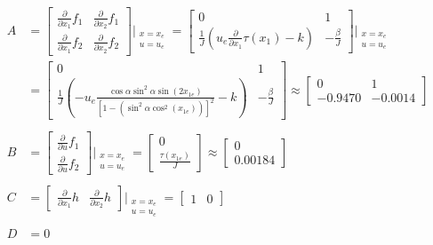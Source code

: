 \documentclass[a4paper, 11pt]{article}
\begin{document}
\begin{align*}
A &= \begin{bmatrix}
    \frac \partial {\partial x_1} f_1 & \frac \partial {\partial x_2} f_1
    \\ \frac \partial {\partial x_1} f_2 & \frac \partial {\partial x_2} f_2
\end{bmatrix} \big |_{\substack{x = x_e \\ u = u_e}}
= \begin{bmatrix}
    0 & 1
    \\ \frac 1 J (u_e \frac \partial {\partial x_1} \tau(x_1) - k) & - \frac \beta J
\end{bmatrix} \big |_{\substack{x = x_e \\ u = u_e}}
\\ &= \begin{bmatrix}
0 & 1
\\ \frac 1 J (-u_e \frac {\cos \alpha \sin^2 \alpha \sin(2 x_{1e})} {[1-(\sin^2\alpha \cos^2(x_{1e}))]^2} - k) & - \frac \beta J
\end{bmatrix}
\approx \begin{bmatrix}
0 & 1
\\ -0.9470 & -0.0014
\end{bmatrix}
\\ \\
B &= \begin{bmatrix}
    \frac \partial {\partial u} f_1
    \\ \frac \partial {\partial u} f_2
\end{bmatrix} \big |_{\substack{x = x_e \\ u = u_e}}
= \begin{bmatrix}
    0
    \\ \frac {\tau(x_{1e})} J
\end{bmatrix} \approx \begin{bmatrix}
    0
    \\ 0.00184
\end{bmatrix}
\\ \\
C &= \begin{bmatrix}
    \frac \partial {\partial x_1} h & \frac \partial {\partial x_2} h
\end{bmatrix} \big |_{\substack{x = x_e \\ u = u_e}}
= \begin{bmatrix}
    1 & 0
\end{bmatrix}
\\ \\
D &= 0
\end{align*}
\end{document}
